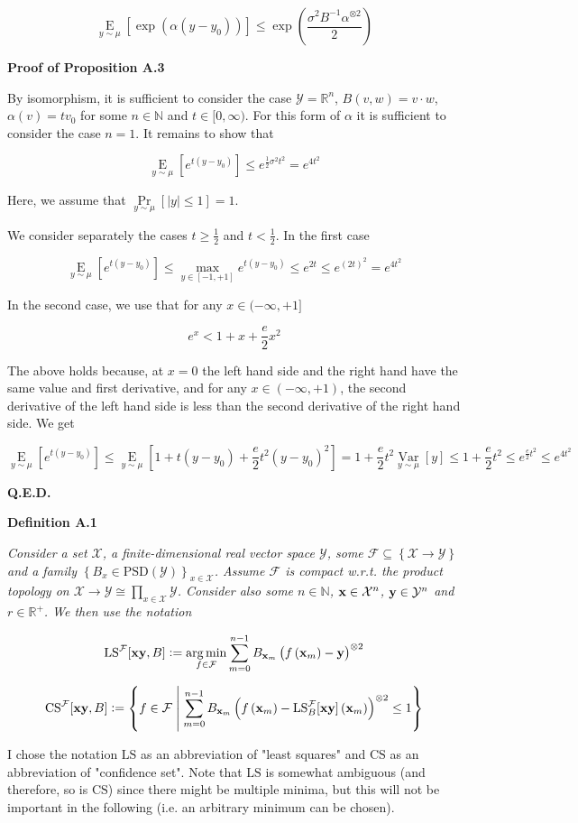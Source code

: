 \documentclass[a4paper]{article}
\newcommand{\Co}[1]{}
\newcommand{\AP}[1]{\left(#1\right)}
\newcommand{\AB}[1]{\left[#1\right]}
\newcommand{\AC}[1]{\left\{#1\right\}}
\newcommand{\ACM}[2]{\left\{#1\;\middle\vert\;#2\right\}}
\newcommand{\Pa}[2]{\underset{#1}{\operatorname{Pr}}\AB{#2}}
\newcommand{\Ea}[2]{\underset{#1}{\operatorname{E}}\AB{#2}}
\newcommand{\Var}[2]{\underset{#1}{\operatorname{Var}}\AB{#2}}
\newcommand{\Argmin}[1]{\underset{#1}{\operatorname{arg\,min}}\,}
\newcommand{\Nats}{\mathbb{N}}
\newcommand{\Reals}{\mathbb{R}}
\newcommand{\PSD}{\mathrm{PSD}}
\newcommand{\Abs}[1]{\left\vert #1 \right\vert}
\newcommand{\B}{B}
\newcommand{\X}{\mathcal{X}}
\newcommand{\Y}{\mathcal{Y}}
\newcommand{\F}{\mathcal{F}}
\newcommand{\LS}{\mathrm{LS}}
\newcommand{\CS}{\mathrm{CS}}
\begin{document}
$$\Ea{y\sim\mu}{\exp\AP{\alpha\AP{y-y_0}}} \leq \exp\AP{\frac{\sigma^2\B ^{-1}\alpha^{\otimes 2}}{2}}$$

\textbf{Proof of Proposition A.3}\Co{b}

By isomorphism, it is sufficient to consider the case $\Y=\Reals^n$, $B(v,w)=v\cdot w$, $\alpha(v)=tv_0$ for some $n\in\Nats$ and $t\in[0,\infty)$. For this form of $\alpha$ it is sufficient to consider the case $n=1$. It remains to show that

$$\Ea{y\sim\mu}{e^{t\AP{y-y_0}}}\leq e^{\frac{1}{2}\sigma^2t^2}=e^{4t^2}$$

Here, we assume that $\Pa{y\sim\mu}{\Abs{y}\leq1}=1$.

We consider separately the cases $t\geq\frac{1}{2}$ and $t<\frac{1}{2}$. In the first case

$$\Ea{y\sim\mu}{e^{t\AP{y-y_0}}}\leq \max_{y\in[-1,+1]}{e^{t(y-y_0)}} \leq e^{2t}\leq e^{(2t)^2}=e^{4t^2}$$

In the second case, we use that for any $x\in(-\infty,+1]$

$$e^x<1+x+\frac{e}{2}x^2$$

The above holds because, at $x=0$ the left hand side and the right hand have the same value and first derivative, and for any $x\in(-\infty,+1)$, the second derivative of the left hand side is less than the second derivative of the right hand side. We get

$$\Ea{y\sim\mu}{e^{t\AP{y-y_0}}}\leq\Ea{y\sim\mu}{1+t\AP{y-y_0}+\frac{e}{2}t^2\AP{y-y_0}^2}=1+\frac{e}{2}t^2\Var{y\sim\mu}{y}\leq1+\frac{e}{2}t^2\leq e^{\frac{e}{2}t^2}\leq e^{4t^2}$$

\textbf{Q.E.D.}\Co{b}

\textbf{Definition A.1}\Co{b}

\textit{Consider a set $\X$, a finite-dimensional real vector space $\Y$, some $\F\subseteq\AC{\X\rightarrow\Y}$ and a family $\AC{\B _x\in\PSD(\Y)}_{x\in\X}$. Assume $\F$ is compact w.r.t. the product topology on $\X\rightarrow\Y\cong\prod_{x\in\X}\Y$. Consider also some $n\in\Nats$, $\bold{x}\in\X^n$, $\bold{y}\in\Y^n$ and $r\in\Reals^+$. We then use the notation}\Co{i}

$$\LS^{\F}[\bold{xy},\B]:=\Argmin{f\in\F}{\sum_{m=0}^{n-1}\B _{\bold{x}_m}\AP{f\AP{\bold{x}_m}-\bold{y} }^{\otimes2}}$$

$$\CS^{\F}[\bold{xy},B]:=\ACM{f\in\F}{\sum_{m=0}^{n-1}\B _{\bold{x}_m}\AP{f\AP{\bold{x}_m}-\LS_\B ^\F[\bold{xy}]\AP{\bold{x}_m}}^{\otimes2}\leq 1}$$

I chose the notation $\LS$ as an abbreviation of "least squares" and $\CS$ as an abbreviation of "confidence set". Note that $\LS$ is somewhat ambiguous (and therefore, so is $\CS$) since there might be multiple minima, but this will not be important in the following (i.e. an arbitrary minimum can be chosen).
\end{document}
